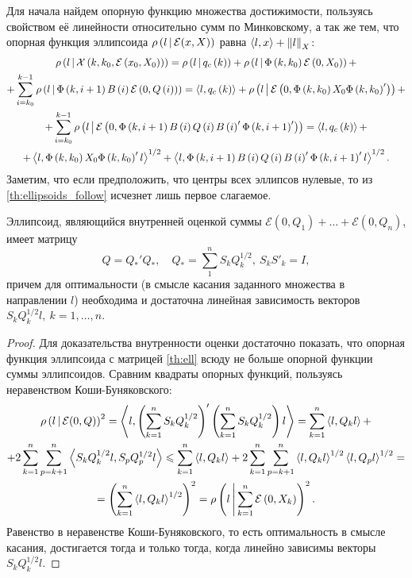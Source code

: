 \documentclass[10pt, a4paper]{article}
\renewcommand{\ell}{\mathcal{E}}
\begin{document}
Для начала найдем опорную функцию множества достижимости, пользуясь свойством её линейности относительно сумм по Минковскому, а так же тем, что опорная функция эллипсоида $\sufu{l}{\ell(x,X)}$ равна $\left<l,x\right>+\left\| l \right\|_X$:
\begin{gather}\label{th:ellipsoids_follow}
\notag\sufu{l}{\mathcal{X}\left(k,k_0,\ell\left(x_0,X_0\right)\right)} = \sufu{l}{q_c\left(k\right)} + \sufu{l}{\Phi\left(k,k_0\right)\ell\left(0,X_0\right)} +\\ 
			\notag + 
			 \sum\limits_{i=k_0}^{k-1}\sufu{l}{\Phi\left(k,i+1\right)B\left(i\right)\ell\left(0,Q\left(i\right)\right)} = 
			 \scalar{l}{q_c\left(k\right)} + 
				\sufu{l}{\ell\left(0,\Phi\left(k,k_0\right)X_0\Phi\left(k,k_0\right)'\right)} + \\
			\notag +\sum\limits_{i=k_0}^{k-1} 
				\sufu{l}{
					\ell\left(0,\Phi\left(k,i+1\right)B\left(i\right)Q\left(i\right)B\left(i\right)'\Phi\left(k,i+1\right)'\right)} = 
			 \scalar{l}{q_c\left(k\right)} +\\+ \scalar{l}{\Phi\left(k,k_0\right)X_0\Phi\left(k,k_0\right)'l}^{1/2}
			  +
			\scalar{l}{\Phi\left(k,i+1\right)B\left(i\right)Q\left(i\right)B\left(i\right)'\Phi\left(k,i+1\right)'l}^{1/2}.
\end{gather}
Заметим, что если предположить, что центры всех эллипсов нулевые, то из \eqref{th:ellipsoids_follow} исчезнет лишь первое слагаемое.
\begin{theorem}\label{th_st:internal}
Эллипсоид, являющийся внутренней оценкой суммы $\ell(0,Q_1)+\dots+\ell(0,Q_n)$, имеет матрицу
\begin{equation}\label{th:ell} Q = Q_*'Q_*,\quad Q_*=\sum\limits_{1}^{n} S_kQ_k^{1/2},\ S_kS'_k=I, \end{equation}
причем для оптимальности (в смысле касания заданного множества в направлении $l$) необходима и достаточна линейная зависимость векторов $S_kQ_k^{1/2}l,\ k=1,\dots,n.$
\end{theorem}
\begin{proof}
Для доказательства внутренности оценки достаточно показать, что опорная функция эллипсоида с матрицей \eqref{th:ell} всюду не больше опорной функции суммы эллипсоидов. Сравним квадраты опорных функций, пользуясь неравенством Коши-Буняковского:
\begin{gather*}
	\sufu{l}{\ell(0,Q)}^2 = \scalar {l}{\left( \sum\limits_{k=1}^{n}S_k Q_k^{1/2} \right)'\left( \sum\limits_{k=1}^{n}S_k Q_k^{1/2} \right)l} = 
	\sum\limits_{k=1}^{n}\scalar{l}{Q_kl} +  \\
		+ 2\sum\limits_{k=1}^{n} \sum\limits_{p=k+1}^{n}\scalar{S_kQ_k^{1/2}l}{S_pQ_p^{1/2}l} 
	\leqslant \sum\limits_{k=1}^{n}\scalar{l}{Q_kl} + 
		2\sum\limits_{k=1}^{n} \sum\limits_{p=k+1}^{n}\scalar{l}{Q_kl}^{1/2}\scalar{l}{Q_pl}^{1/2} = \\
	= \left( \sum\limits_{k=1}^{n}\scalar{l}{Q_kl}^{1/2} \right)^2 
	= \sufu{l}{\sum\limits_{k=1}^{n} \ell\left(0,X_k\right)}^2.
\end{gather*}
Равенство в неравенстве Коши-Буняковского, то есть оптимальность в смысле касания, достигается тогда и только тогда, когда линейно зависимы векторы $S_kQ_k^{1/2}l$.
\end{proof}
\end{document}
